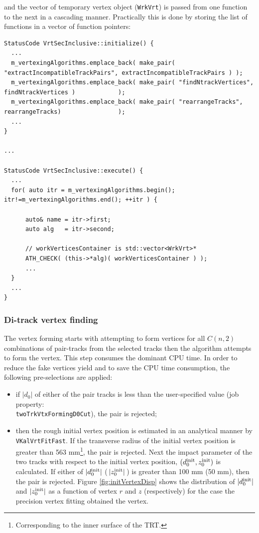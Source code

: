and the vector of temporary vertex object ({\tt WrkVrt}) is passed from one function to the next in a cascading manner. Practically this is done by storing the list of functions in a vector of function pointers:

\begin{scriptsize}
\begin{verbatim}
StatusCode VrtSecInclusive::initialize() {
  ...
  m_vertexingAlgorithms.emplace_back( make_pair( "extractIncompatibleTrackPairs", extractIncompatibleTrackPairs ) );
  m_vertexingAlgorithms.emplace_back( make_pair( "findNtrackVertices",            findNtrackVertices )            );
  m_vertexingAlgorithms.emplace_back( make_pair( "rearrangeTracks",               rearrangeTracks)                );
  ...
}

...

StatusCode VrtSecInclusive::execute() {
  ...
  for( auto itr = m_vertexingAlgorithms.begin(); itr!=m_vertexingAlgorithms.end(); ++itr ) {
      
      auto& name = itr->first;
      auto alg   = itr->second;
      
      // workVerticesContainer is std::vector<WrkVrt>*
      ATH_CHECK( (this->*alg)( workVerticesContainer ) );
      ...
  }
  ...
}
\end{verbatim}
\end{scriptsize}


\subsubsection{Di-track vertex finding}\label{sec:ditrack}

The vertex forming starts with attempting to form vertices for all $C(n,2)$ combinations of pair-tracks from the selected tracks then the algorithm attempts to form the vertex. This step consumes the dominant CPU time. In order to reduce the fake vertices yield and to save the CPU time consumption, the following pre-selections are applied:

\begin{itemize}
\item if $|d_{0}|$ of either of the pair tracks is less than the user-specified value (job property:\\ {\tt twoTrkVtxFormingD0Cut}), the pair is rejected;
\item then the rough initial vertex position is estimated in an analytical manner by {\tt VKalVrtFitFast}. If the transverse radius of the initial vertex position is greater than 563 mm\footnote{Corresponding to the inner surface of the TRT.}, the pair is rejected. Next the impact parameter of the two tracks with respect to the initial vertex position, $(d_{0}^{\rm init}, z_{0}^{\rm init})$ is calculated. If either of $|d_{0}^{\rm init}|$ (\,$|z_{0}^{\rm init}|$\,) is greater than 100 mm (50 mm), then the pair is rejected. Figure \ref{fig:initVertexDisp} shows the distribution of $|d_{0}^{\rm init}|$ and $|z_{0}^{\rm init}|$ as a function of vertex $r$ and $z$ (respectively) for the case the precision vertex fitting obtained the vertex.
\end{itemize}

